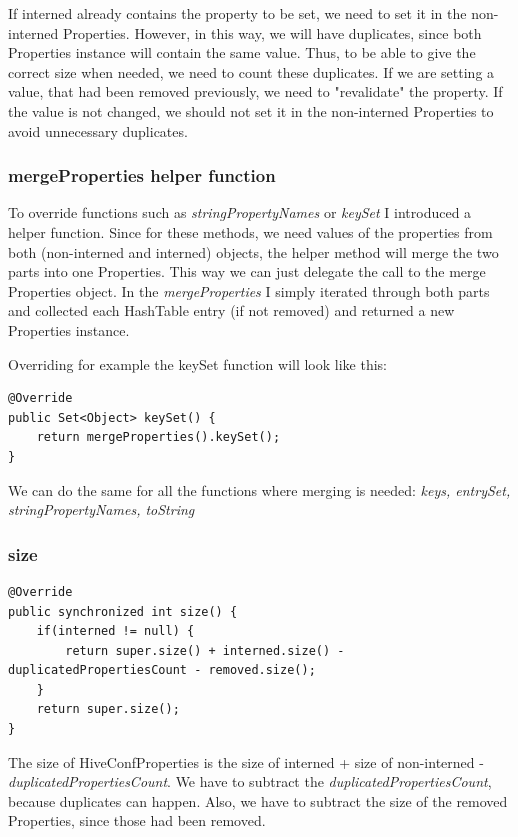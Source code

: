 If interned already contains the property to be set, we need to set it in the non-interned Properties. However, in this way, we will have duplicates, since both Properties instance will contain the same value. Thus, to be able to give the correct size when needed, we need to count these duplicates. If we are setting a value, that had been removed previously, we need to "revalidate" the property. If the value is not changed, we should not set it in the non-interned Properties to avoid unnecessary duplicates. 

\subsubsection{mergeProperties helper function}
To override functions such as \textit{stringPropertyNames} or \textit{keySet} \etc I introduced a helper function. Since for these methods, we need values of the properties from both (non-interned and interned) objects, the helper method will merge the two parts into one Properties. This way we can just delegate the call to the merge Properties object. In the \textit{mergeProperties} I simply iterated through both parts and collected each HashTable entry (if not removed) and returned a new Properties instance. 

Overriding for example the keySet function will look like this:
\begin{lstlisting}
@Override
public Set<Object> keySet() {
	return mergeProperties().keySet();
}
\end{lstlisting}

We can do the same for all the functions where merging is needed: \textit{keys, entrySet, stringPropertyNames, toString \etc}

\subsubsection{size}
\begin{lstlisting}
@Override
public synchronized int size() {
	if(interned != null) {
		return super.size() + interned.size() - duplicatedPropertiesCount - removed.size();
	}
	return super.size();
}
\end{lstlisting}
The size of HiveConfProperties is the size of interned + size of non-interned - \textit{duplicatedPropertiesCount}. We have to subtract the \textit{duplicatedPropertiesCount}, because duplicates can happen. Also, we have to subtract the size of the removed Properties, since those had been removed.

